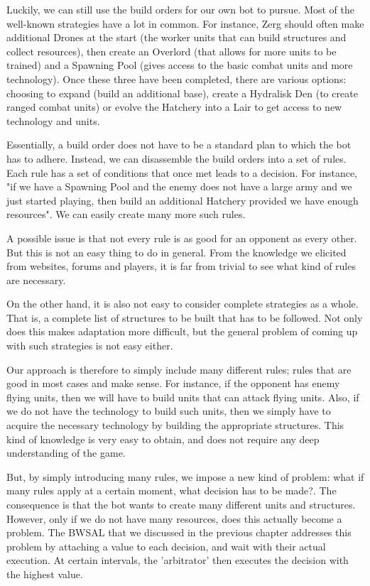 Luckily, we can still use the build orders for our own bot to pursue. Most of the well-known strategies have a lot in common. For instance, Zerg should often make additional Drones at the start (the worker units that can build structures and collect resources), then create an Overlord (that allows for more units to be trained) and a Spawning Pool (gives access to the basic combat units and more technology). Once these three have been completed, there are various options: choosing to expand (build an additional base), create a Hydralisk Den (to create ranged combat units) or evolve the Hatchery into a Lair to get access to new technology and units.

Essentially, a build order does not have to be a standard plan to which the bot has to adhere. Instead, we can disassemble the build orders into a set of rules. Each rule has a set of conditions that once met leads to a decision. For instance, "if we have a Spawning Pool and the enemy does not have a large army and we just started playing, then build an additional Hatchery provided we have enough resources".  We can easily create many more such rules.

A possible issue is that not every rule is as good for an opponent as every other. But this is not an easy thing to do in general. From the knowledge we elicited from websites, forums and players, it is far from trivial to see what kind of rules are necessary.

On the other hand, it is also not easy to consider complete strategies as a whole. That is, a complete list of structures to be built that has to be followed. Not only does this makes adaptation more difficult, but the general problem of coming up with such strategies is not easy either.

Our approach is therefore to simply include many different rules; rules that are good in most cases and make sense. For instance, if the opponent has enemy flying units, then we will have to build units that can attack flying units. Also, if we do not have the technology to build such units, then we simply have to acquire the necessary technology by building the appropriate structures. This kind of knowledge is very easy to obtain, and does not require any deep understanding of the game.

But, by simply introducing many rules, we impose a new kind of problem: what if many rules apply at a certain moment, what decision has to be made?. The consequence is that the bot wants to create many different units and structures. However, only if we do not have many resources, does this actually become a problem. The BWSAL that we discussed in the previous chapter addresses this problem by attaching a value to each decision, and wait with their actual execution. At certain intervals, the 'arbitrator' then executes the decision with the highest value.

